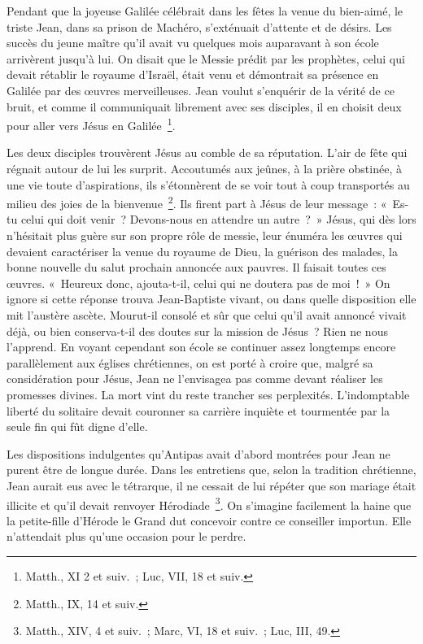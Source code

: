 \documentclass[french,twoside]{book} %
\newcommand\chaptercont{} %
\begin{document}
\chaptercont
\noindent Pendant que la joyeuse Galilée célébrait dans les fêtes la venue du bien-aimé, le triste Jean, dans sa prison de Machéro, s’exténuait d’attente et de désirs. Les succès du jeune maître qu’il avait vu quelques mois auparavant à son école arrivèrent jusqu’à lui. On disait que le Messie prédit par les prophètes, celui qui devait rétablir le royaume d’Israël, était venu et démontrait sa présence en Galilée par des œuvres merveilleuses. Jean voulut s’enquérir de la vérité de ce bruit, et comme il communiquait librement avec ses disciples, il en choisit deux pour aller vers Jésus en Galilée \footnote{Matth., XI 2 et suiv. ; Luc, VII, 18 et suiv.}.\par
Les deux disciples trouvèrent Jésus au comble de sa réputation. L’air de fête qui régnait autour de lui les surprit. Accoutumés aux jeûnes, à la prière obstinée, à une vie toute d’aspirations, ils s’étonnèrent de se voir tout à coup transportés au milieu des joies de la bienvenue \footnote{Matth., IX, 14 et suiv.}. Ils firent part à Jésus de leur message : « Es-tu celui qui doit venir ? Devons-nous en attendre un autre ? » Jésus, qui dès lors n’hésitait plus guère sur son propre rôle de messie, leur énuméra les œuvres qui devaient caractériser la venue du royaume de Dieu, la guérison des malades, la bonne nouvelle du salut prochain annoncée aux pauvres. Il faisait toutes ces œuvres. « Heureux donc, ajouta-t-il, celui qui ne doutera pas de moi ! » On ignore si cette réponse trouva Jean-Baptiste vivant, ou dans quelle disposition elle mit l’austère ascète. Mourut-il consolé et sûr que celui qu’il avait annoncé vivait déjà, ou bien conserva-t-il des doutes sur la mission de Jésus ? Rien ne nous l’apprend. En voyant cependant son école se continuer assez longtemps encore parallèlement aux églises chrétiennes, on est porté à croire que, malgré sa considération pour Jésus, Jean ne l’envisagea pas comme devant réaliser les promesses divines. La mort vint du reste trancher ses perplexités. L’indomptable liberté du solitaire devait couronner sa carrière inquiète et tourmentée par la seule fin qui fût digne d’elle.\par
Les dispositions indulgentes qu’Antipas avait d’abord montrées pour Jean ne purent être de longue durée. Dans les entretiens que, selon la tradition chrétienne, Jean aurait eus avec le tétrarque, il ne cessait de lui répéter que son mariage était illicite et qu’il devait renvoyer Hérodiade \footnote{Matth., XIV, 4 et suiv. ; Marc, VI, 18 et suiv. ; Luc, III, 49.}. On s’imagine facilement la haine que la petite-fille d’Hérode le Grand dut concevoir contre ce conseiller importun. Elle n’attendait plus qu’une occasion pour le perdre.\par
\end{document}
